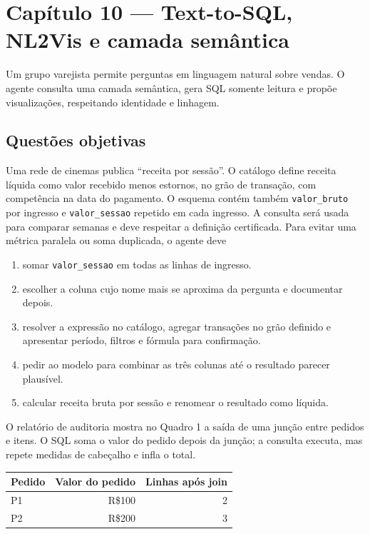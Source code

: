 \section{Capítulo 10 --- Text-to-SQL, NL2Vis e camada semântica}

Um grupo varejista permite perguntas em linguagem natural sobre vendas. O agente consulta uma camada semântica, gera SQL somente leitura e propõe visualizações, respeitando identidade e linhagem.

\subsection{Questões objetivas}

\TextoBase Uma rede de cinemas publica ``receita por sessão''. O catálogo define receita líquida como valor recebido menos estornos, no grão de transação, com competência na data do pagamento. O esquema contém também \texttt{valor\_bruto} por ingresso e \texttt{valor\_sessao} repetido em cada ingresso. A consulta será usada para comparar semanas e deve respeitar a definição certificada.
\FonteDidatica
\Comando Para evitar uma métrica paralela ou soma duplicada, o agente deve
\begin{enumerate}[label=\Alph*)]
\item somar \texttt{valor\_sessao} em todas as linhas de ingresso.
\item escolher a coluna cujo nome mais se aproxima da pergunta e documentar depois.
\item resolver a expressão no catálogo, agregar transações no grão definido e apresentar período, filtros e fórmula para confirmação.
\item pedir ao modelo para combinar as três colunas até o resultado parecer plausível.
\item calcular receita bruta por sessão e renomear o resultado como líquida.
\end{enumerate}

\TextoBase

O relatório de auditoria mostra no Quadro 1 a saída de uma junção entre pedidos e itens. O SQL soma o valor do pedido depois da junção; a consulta executa, mas repete medidas de cabeçalho e infla o total.
\begin{DocumentBox}
\begin{tabularx}{\textwidth}{@{}Yrr@{}}\toprule
\textbf{Pedido} & \textbf{Valor do pedido} & \textbf{Linhas após join}\\\midrule
P1 & R\$100 & 2\\ P2 & R\$200 & 3\\\bottomrule
\end{tabularx}
\end{DocumentBox}

